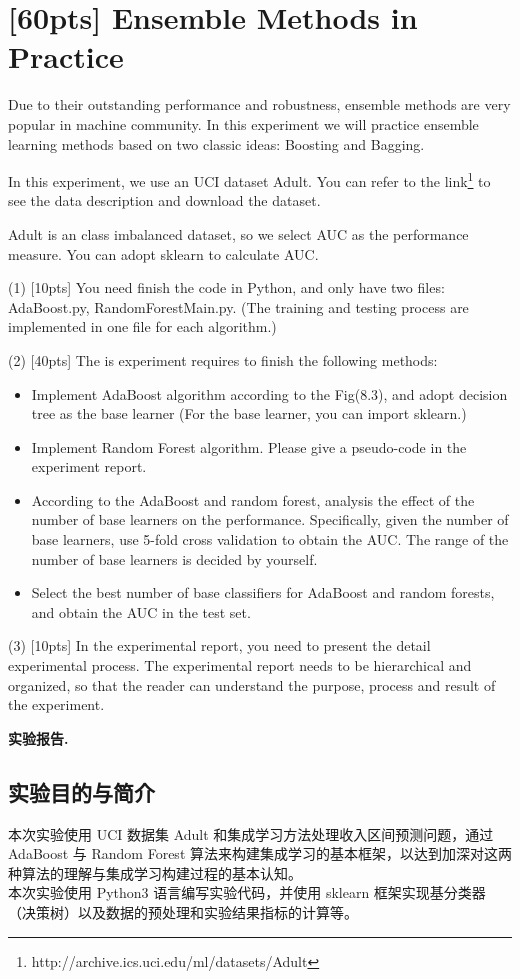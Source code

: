 \documentclass{article}
\begin{document}
	\section{[60pts] Ensemble Methods in Practice}
	
	Due to their outstanding performance and robustness, ensemble methods are very popular in machine community. In this experiment we will practice ensemble learning methods based on two classic
	ideas: Boosting and Bagging.
	
	In this experiment, we use an UCI dataset Adult. You can refer to the link\footnote{http://archive.ics.uci.edu/ml/datasets/Adult} to see the data description and download the dataset.
	
	Adult is an class imbalanced dataset, so we select AUC as the performance measure. You can adopt sklearn to calculate AUC.
	
(1) [10pts] You need finish the code in Python, and only have two files: AdaBoost.py, RandomForestMain.py. (The training and testing process are implemented in one file for each algorithm.)
	
(2) [40pts] The is experiment requires to finish the following methods:
	
		\begin{itemize}
			\item Implement AdaBoost algorithm according to the Fig(8.3), and adopt decision tree as the base learner (For the base learner, you can import sklearn.)
			\item  Implement Random Forest algorithm. Please give a pseudo-code in the experiment report.
			\item According to the AdaBoost and random forest, analysis the effect of the number of base learners on the performance. Specifically, given the number of base learners, use 5-fold cross validation to obtain the AUC. The range of the number of base learners is decided by yourself.
			\item Select the best number of base classifiers for AdaBoost and random forests, and obtain the AUC in the test set.
		\end{itemize}

(3) [10pts] In the experimental report, you need to present the detail experimental process. The experimental report needs to be hierarchical and organized, so that the reader can understand the purpose, process and result of the experiment.
		
\clearpage
\noindent\textbf{实验报告.}

\subsection{实验目的与简介}
本次实验使用 UCI 数据集 Adult 和集成学习方法处理收入区间预测问题，通过 AdaBoost 与 Random Forest 算法来构建集成学习的基本框架，以达到加深对这两种算法的理解与集成学习构建过程的基本认知。\\
本次实验使用 Python3 语言编写实验代码，并使用 sklearn 框架实现基分类器（决策树）以及数据的预处理和实验结果指标的计算等。\\
\end{document}
